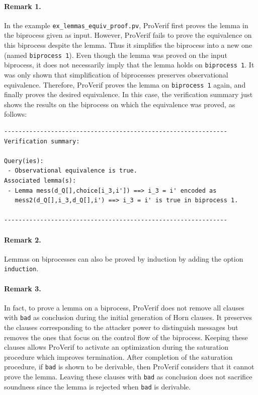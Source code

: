 \documentclass{book}
\begin{document}
\paragraph{Remark 1.} In the example \texttt{{\docexdir}ex\_lemmas\_equiv\_proof.pv}, ProVerif first proves the lemma in the biprocess given as input. However, ProVerif fails to prove the equivalence on this biprocess despite the lemma. Thus it simplifies the biprocess into a new one (named \lstinline!biprocess 1!). Even though the lemma was proved on the input biprocess, it does not necessarily imply that the lemma holds on \lstinline!biprocess 1!. It was only shown that simplification of biprocesses preserves observational equivalence. Therefore, ProVerif proves the lemma on \lstinline!biprocess 1! again, and finally proves the desired equivalence. In this case, the verification summary just shows the results on the biprocess on which the equivalence was proved, as follows:
\begin{verbatim}
--------------------------------------------------------------
Verification summary:

Query(ies):
 - Observational equivalence is true.
Associated lemma(s):
 - Lemma mess(d_Q[],choice[i_3,i']) ==> i_3 = i' encoded as
   mess2(d_Q[],i_3,d_Q[],i') ==> i_3 = i' is true in biprocess 1.

--------------------------------------------------------------
\end{verbatim}

\paragraph{Remark 2.} Lemmas on biprocesses can also be proved by induction by adding the option \lstinline!induction!.

\paragraph{Remark 3.} In fact, to prove a lemma on a biprocess, ProVerif does not remove all clauses with \lstinline!bad! as conclusion during the initial generation of Horn clauses. It preserves the clauses corresponding to the attacker power to distinguish messages but removes the ones that focus on the control flow of the biprocess. Keeping these clauses allows ProVerif to activate an optimization during the saturation procedure which improves termination. After completion of the saturation procedure, if \lstinline!bad! is shown to be derivable, then ProVerif considers that it cannot prove the lemma. Leaving these clauses with \lstinline!bad! as conclusion does not sacrifice soundness since the lemma is rejected when \lstinline!bad! is derivable.
\end{document}
